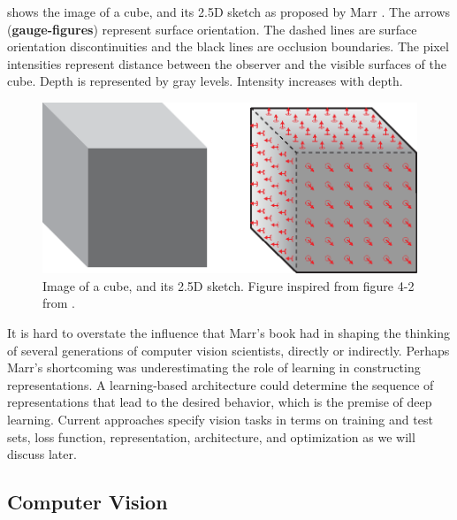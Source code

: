 \Fig{\ref{fig:sketch}} shows the image of a cube, and its 
2.5D
sketch as proposed by Marr \cite{Marr82}. The arrows ({\bf gauge-figures}) represent surface orientation. The dashed lines are surface orientation discontinuities and the black lines are occlusion boundaries. The pixel intensities represent distance between the observer and the visible surfaces of the cube. Depth is represented by gray levels. Intensity increases with depth. 


 

\begin{figure}[t]
\centerline{
\includegraphics[width=.9\linewidth]{figures/taxonomy/sketch.eps}
} 
\caption{Image of a cube, and its 
2.5D
sketch. Figure inspired from figure 4-2 from \cite{Marr82}.} 
\label{fig:sketch}
\end{figure}



It is hard to overstate the influence that Marr’s book had in shaping the thinking of several generations of computer vision scientists, directly or indirectly.
Perhaps Marr's shortcoming was underestimating the role of learning in constructing representations. A learning-based architecture could
determine the sequence of representations that lead to the desired behavior, which is the premise of deep learning.  Current approaches specify vision tasks in terms on training and test sets, loss function, representation, architecture, and optimization as we will discuss later. 



\subsection{Computer Vision}

